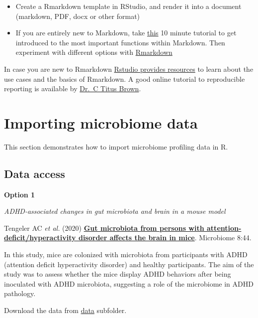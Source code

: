 \documentclass[
  oneside]{book}
\begin{document}
\begin{itemize}
\item
  Create a Rmarkdown template in RStudio, and render it into a
  document (markdown, PDF, docx or other format)
\item
  If you are entirely new to Markdown, take
  \href{https://www.markdowntutorial.com/}{this} 10 minute tutorial to get
  introduced to the most important functions within Markdown. Then
  experiment with different options with
  \href{https://www.rstudio.com/wp-content/uploads/2015/02/rmarkdown-cheatsheet.pdf}{Rmarkdown}
\end{itemize}

In case you are new to Rmarkdown \href{https://rmarkdown.rstudio.com/lesson-1.html}{Rstudio provides
resources} to learn
about the use cases and the basics of Rmarkdown. A good online
tutorial to reproducible reporting is available by \href{https://rpubs.com/marschmi/RMarkdown}{Dr.~C Titus
Brown}.

\hypertarget{importing-microbiome-data}{%
\chapter{Importing microbiome data}\label{importing-microbiome-data}}

This section demonstrates how to import microbiome profiling data in R.

\hypertarget{data-access}{%
\section{Data access}\label{data-access}}

\textbf{Option 1}

\emph{ADHD-associated changes in gut microbiota and brain in a mouse model}

Tengeler AC \emph{et
al.} (2020) \href{https://doi.org/10.1186/s40168-020-00816-x}{\textbf{Gut microbiota from persons with
attention-deficit/hyperactivity disorder affects the brain in
mice}}. Microbiome
8:44.

In this study, mice are colonized with microbiota from participants
with ADHD (attention deficit hyperactivity disorder) and healthy
participants. The aim of the study was to assess whether the mice
display ADHD behaviors after being inoculated with ADHD microbiota,
suggesting a role of the microbiome in ADHD pathology.

Download the data from
\href{https://github.com/microbiome/course_2021_radboud/tree/main/data}{data}
subfolder.
\end{document}

